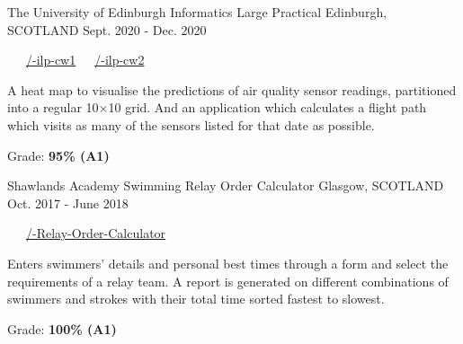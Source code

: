 \begin{cventries}
  \cventry
    {The University of Edinburgh} %
    {Informatics Large Practical} %
    {Edinburgh, SCOTLAND} %
    {Sept. 2020 - Dec. 2020} %
    {
      \color{awesome} \color{graytext}\ \ \ \href{https://github.com/chrisjpm/inf3-ilp-cw1}{\faGithub\acvHeaderIconSep\@chrisjpm/-ilp-cw1}\ \ \ \href{https://github.com/chrisjpm/inf3-ilp-cw2}{\faGithub\acvHeaderIconSep\@chrisjpm/-ilp-cw2}
      \vspace{1.6em}
      \begin{cvitems} %
        \item A heat map to visualise the predictions of air quality sensor readings, partitioned into a regular 10×10 grid. And an application which calculates a flight path which visits as many of the sensors listed for that date as possible.
        \item Grade: \textbf{95\% (A1)}
      \end{cvitems}
    }
  \cventry
    {Shawlands Academy} %
    {Swimming Relay Order Calculator} %
    {Glasgow, SCOTLAND} %
    {Oct. 2017 - June 2018} %
    {
      \color{awesome}        \color{graytext}\ \ \ \href{https://github.com/chrisjpm/Swimming-Relay-Order-Calculator}{\faGithub\acvHeaderIconSep\@chrisjpm/\@Swimming-Relay-Order-Calculator}
      \vspace{1.6em}
      \begin{cvitems} %
        \item Enters swimmers' details and personal best times through a form and select the requirements of a relay team. A report is generated on different combinations of swimmers and strokes with their total time sorted fastest to slowest.
        \item Grade: \textbf{100\% (A1)}
      \end{cvitems}
    }
\end{cventries}
\vspace{-.5em}
